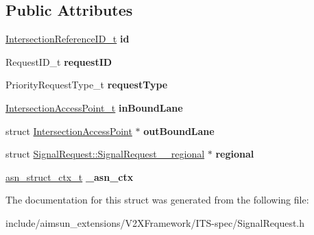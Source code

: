 \subsection*{Public Attributes}
\begin{DoxyCompactItemize}
\item 
\hyperlink{structIntersectionReferenceID}{Intersection\+Reference\+I\+D\+\_\+t} {\bfseries id}\hypertarget{structSignalRequest_a89a2733238225e4fdaa88d68092189dc}{}\label{structSignalRequest_a89a2733238225e4fdaa88d68092189dc}

\item 
Request\+I\+D\+\_\+t {\bfseries request\+ID}\hypertarget{structSignalRequest_a4351926a43b660ff4cbd91f120a1067d}{}\label{structSignalRequest_a4351926a43b660ff4cbd91f120a1067d}

\item 
Priority\+Request\+Type\+\_\+t {\bfseries request\+Type}\hypertarget{structSignalRequest_a5f822891955e15359e713f840ba08de3}{}\label{structSignalRequest_a5f822891955e15359e713f840ba08de3}

\item 
\hyperlink{structIntersectionAccessPoint}{Intersection\+Access\+Point\+\_\+t} {\bfseries in\+Bound\+Lane}\hypertarget{structSignalRequest_aa62f8f7ad714918cdeb6aec7c4493d21}{}\label{structSignalRequest_aa62f8f7ad714918cdeb6aec7c4493d21}

\item 
struct \hyperlink{structIntersectionAccessPoint}{Intersection\+Access\+Point} $\ast$ {\bfseries out\+Bound\+Lane}\hypertarget{structSignalRequest_af7c1f90d3364605050445c5d25a6def3}{}\label{structSignalRequest_af7c1f90d3364605050445c5d25a6def3}

\item 
struct \hyperlink{structSignalRequest_1_1SignalRequest____regional}{Signal\+Request\+::\+Signal\+Request\+\_\+\+\_\+regional} $\ast$ {\bfseries regional}\hypertarget{structSignalRequest_a5ab8bb822b603bf6643f6f099d3afb10}{}\label{structSignalRequest_a5ab8bb822b603bf6643f6f099d3afb10}

\item 
\hyperlink{structasn__struct__ctx__s}{asn\+\_\+struct\+\_\+ctx\+\_\+t} {\bfseries \+\_\+asn\+\_\+ctx}\hypertarget{structSignalRequest_a29bb6d5a94fc14c9c8c311e7cebe56fb}{}\label{structSignalRequest_a29bb6d5a94fc14c9c8c311e7cebe56fb}

\end{DoxyCompactItemize}


The documentation for this struct was generated from the following file\+:\begin{DoxyCompactItemize}
\item 
include/aimsun\+\_\+extensions/\+V2\+X\+Framework/\+I\+T\+S-\/spec/Signal\+Request.\+h\end{DoxyCompactItemize}

